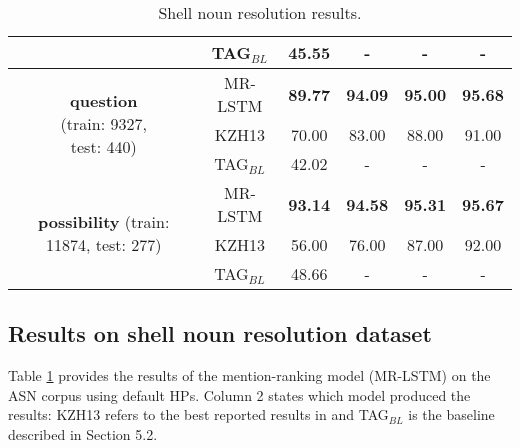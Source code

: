 \documentclass[11pt,letterpaper]{article}
\begin{document}
\begin{table}[t]
{\begin{tabular}{c|c|cccc}
																	  & TAG$_{BL}$ & 45.55 & -     & -     & -     \\
\midrule																	  
 \multirow{3}{*}{\parbox{0.28\linewidth}{\centering \textbf{question}\\ (train: 9327,\\ test: 440)}}      & MR-LSTM     & \textbf{89.77} & \textbf{94.09} & \textbf{95.00} & \textbf{95.68} \\
																	  & KZH13        & 70.00 & 83.00 & 88.00 & 91.00 \\
																	  & TAG$_{BL}$ & 42.02 & -     & -     & -     \\
\midrule																	  
 \multirow{3}{*}{\parbox{0.28\linewidth}{\centering \textbf{possibility} (train: 11874, test: 277)}} & MR-LSTM     & \textbf{93.14} & \textbf{94.58} & \textbf{95.31} & \textbf{95.67} \\
																	  & KZH13        & 56.00 & 76.00 & 87.00 & 92.00 \\
																	  & TAG$_{BL}$ & 48.66 & -     & -     & -\\                              
\bottomrule
\end{tabular}
}
\caption{Shell noun resolution results. }\label{tab:results_asn}
\end{table}


 
\subsection{Results on shell noun resolution dataset}




Table \ref{tab:results_asn} provides the results of the mention-ranking model (MR-LSTM) on the ASN corpus using default HPs. Column 2 states which model produced the results: KZH13 refers to the best reported results in \citet{kolhatkar-zinsmeister-hirst:2013:EMNLP} and TAG$_{BL}$ is the baseline described in Section 5.2.   
\end{document}
